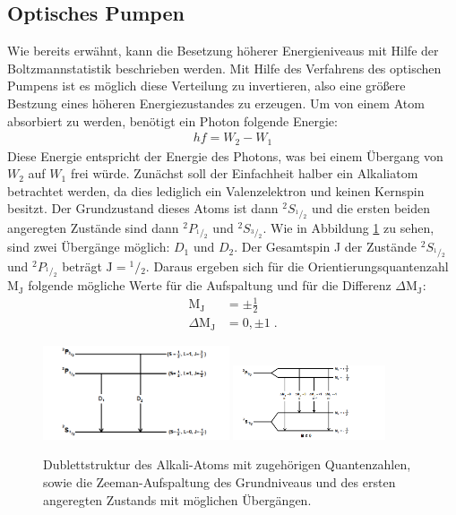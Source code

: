 \subsection{Optisches Pumpen}
Wie bereits erwähnt, kann die Besetzung höherer Energieniveaus mit Hilfe der Boltzmannstatistik beschrieben werden.
Mit Hilfe des Verfahrens des optischen Pumpens ist es möglich diese Verteilung zu invertieren, also eine größere Bestzung eines höheren Energiezustandes zu erzeugen.
Um von einem Atom absorbiert zu werden, benötigt ein Photon folgende Energie:
\begin{align*}
    hf = W_{2} - W_{1}
\end{align*}
Diese Energie entspricht der Energie des Photons, was bei einem Übergang von $W_{2}$ auf $W_{1}$ frei würde.
Zunächst soll der Einfachheit halber ein Alkaliatom betrachtet werden, da dies lediglich ein Valenzelektron und keinen Kernspin besitzt.
Der Grundzustand dieses Atoms ist dann ${}^2S_{{}^1\!/\!_2}$ und die ersten beiden angeregten Zustände sind dann ${}^2P_{{}^1\!/\!_2}$ und ${}^2S_{{}^3\!/\!_2}$. Wie in Abbildung \ref{abb:Aufspaltung2} zu sehen, sind zwei Übergänge möglich: $D_{1}$ und $ D_{2} $.
Der Gesamtspin J der Zustände ${}^2S_{{}^1\!/\!_2}$ und ${}^2P_{{}^1\!/\!_2}$ beträgt $\text{J}= {}^1\!/\!_2$. Daraus ergeben sich für die Orientierungsquantenzahl $\text{M}_\text{J}$ folgende mögliche Werte für die Aufspaltung und für die Differenz $\Delta \text{M}_\text{J}$:
\begin{align*}
    \text{M}_\text{J} &= \pm \frac{1}{2} \\
    \Delta \text{M}_\text{J} &= 0, \pm 1 \; .
\end{align*}
\FloatBarrier
\begin{figure}
    \centering
    \includegraphics[width= 0.49\textwidth, height=0.3\textwidth]{Aufspaltung2.PNG}
    \includegraphics[width=0.40\textwidth, height=0.3\textwidth]{Aufspaltung3.PNG}
    \caption{Dublettstruktur des Alkali-Atoms mit zugehörigen Quantenzahlen, sowie die Zeeman-Aufspaltung des Grundniveaus und des ersten angeregten Zustands mit möglichen Übergängen. \cite{Q1}}
    \label{abb:Aufspaltung2}
\end{figure}

